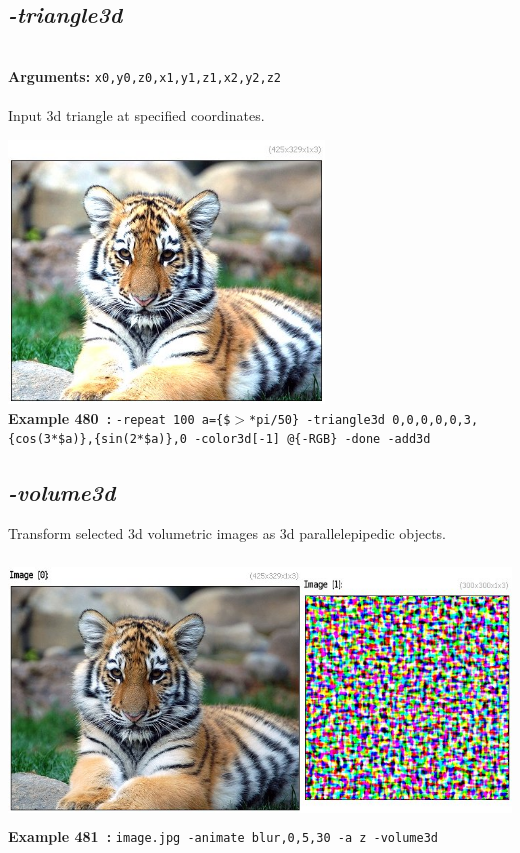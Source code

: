 \documentclass[a4paper,11pt,twoside]{book}
\begin{document}
\subsection{\emph{-triangle3d} }\vspace*{-0.5em}
~\\\textbf{Arguments: } 
{\small \texttt{x0,y0,z0,x1,y1,z1,x2,y2,z2}}\\~\\
Input 3d triangle at specified coordinates.
\begin{center}\includegraphics[keepaspectratio=true,height=7cm,width=\textwidth]{img/gmic_def480.jpg}\\
{\footnotesize \textbf{Example 480~:} \texttt{-repeat 100 a=\{\$$>$*pi/50\} -triangle3d 0,0,0,0,0,3,\{cos(3*\$a)\},\{sin(2*\$a)\},0 -color3d[-1] @\{-RGB\} -done -add3d}}
\end{center}

\subsection{\emph{-volume3d} }\vspace*{-0.5em}
Transform selected 3d volumetric images as 3d parallelepipedic objects.
\begin{center}\includegraphics[keepaspectratio=true,height=7cm,width=\textwidth]{img/gmic_def481.jpg}\\
{\footnotesize \textbf{Example 481~:} \texttt{image.jpg -animate blur,0,5,30 -a z -volume3d}}
\end{center}
\end{document}

